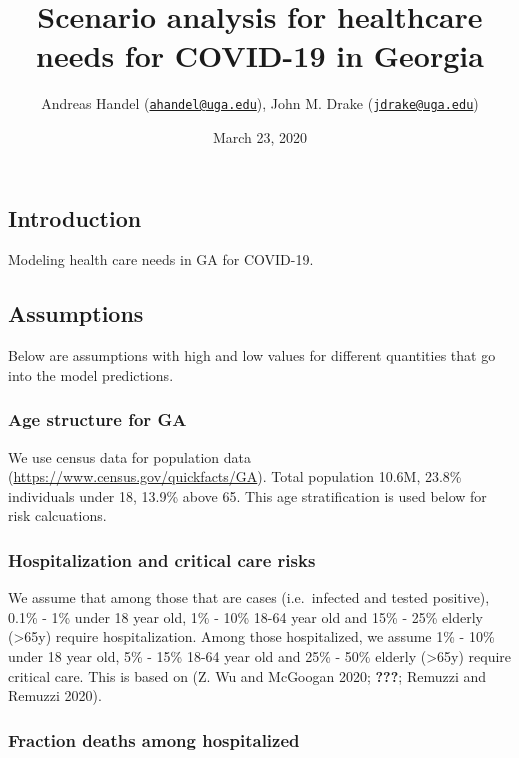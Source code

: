 \documentclass[
]{article}
\title{Scenario analysis for healthcare needs for COVID-19 in Georgia}
\author{Andreas Handel
(\href{mailto:ahandel@uga.edu}{\nolinkurl{ahandel@uga.edu}}), John M.
Drake (\href{mailto:jdrake@uga.edu}{\nolinkurl{jdrake@uga.edu}})}
\date{March 23, 2020}
\begin{document}
\maketitle

\hypertarget{introduction}{%
\subsection{Introduction}\label{introduction}}

Modeling health care needs in GA for COVID-19.

\hypertarget{assumptions}{%
\subsection{Assumptions}\label{assumptions}}

Below are assumptions with high and low values for different quantities
that go into the model predictions.

\hypertarget{age-structure-for-ga}{%
\subsubsection{Age structure for GA}\label{age-structure-for-ga}}

We use census data for population data
(\url{https://www.census.gov/quickfacts/GA}). Total population 10.6M,
23.8\% individuals under 18, 13.9\% above 65. This age stratification is
used below for risk calcuations.

\hypertarget{hospitalization-and-critical-care-risks}{%
\subsubsection{Hospitalization and critical care
risks}\label{hospitalization-and-critical-care-risks}}

We assume that among those that are cases (i.e.~infected and tested
positive), 0.1\% - 1\% under 18 year old, 1\% - 10\% 18-64 year old and
15\% - 25\% elderly (\textgreater65y) require hospitalization. Among
those hospitalized, we assume 1\% - 10\% under 18 year old, 5\% - 15\%
18-64 year old and 25\% - 50\% elderly (\textgreater65y) require
critical care. This is based on (Z. Wu and McGoogan 2020;
{\textbf{???}}; Remuzzi and Remuzzi 2020).

\hypertarget{fraction-deaths-among-hospitalized}{%
\subsubsection{Fraction deaths among
hospitalized}\label{fraction-deaths-among-hospitalized}}
\end{document}

